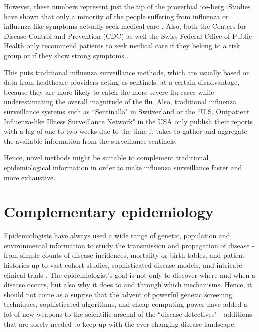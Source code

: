 \documentclass[11pt, a4paper,twoside]{report}\usepackage[]{graphicx}\usepackage[]{color}
\begin{document}
However, these numbers represent just the tip of the proverbial ice-berg. Studies have shown that only a minority of the people suffering from influenza or influenza-like symptoms actually seek medical care \citep{goff_surveillance_2015}. Also, both the Centers for Disease Control and Prevention (CDC) as well the Swiss Federal Office of Public Health only recommend patients to seek medical care if they belong to a risk group or if they show strong symptoms \citep{cdc_flu_2017,bag_grippe_2016}.

This puts traditional influenza surveillance methods, which are usually based on data from healthcare providers acting as sentinels, at a certain disadvantage, because they are more likely to catch the more severe flu cases while underestimating the overall magnitude of the flu. Also, traditional influenza surveillance systems such as ``Sentinalla" in Switzerland \citep{bag_influenza_2017, sentinella_2017} or the ``U.S. Outpatient Influenza-like Illness Surveillance Network" \citep{cdc_surveillance_2016} in the USA only publish their reports with a lag of one to two weeks due to the time it takes to gather and aggregate the available information from the surveillance sentinels.

Hence, novel methods might be suitable to complement traditional epidemiological information in order to make influenza surveillance faster and more exhaustive.

\section{Complementary epidemiology}
Epidemiologists have always used a wide range of genetic, population and environmental information to study the transmission and propagation of disease - from simple counts of disease incidences, mortality or birth tables, and patient histories up to vast cohort studies, sophisticated disease models, and intricate clinical trials \citep{rothman2012epidemiology,koepsell2014epidemiologic}. The epidemiologist's goal is not only to discover where and when a disease occurs, but also why it does to and through which mechanisms. Hence, it should not come as a suprise that the advent of powerful genetic screening techniques, sophisticated algorithms, and cheap computing power have added a lot of new weapons to the scientific arsenal of the ``disease detectives" \citep{bailey2005introduction, khoury_transforming_2013, gardy_real-time_2015} - additions that are sorely needed to keep up with the ever-changing disease landscape.\newline
\end{document}
